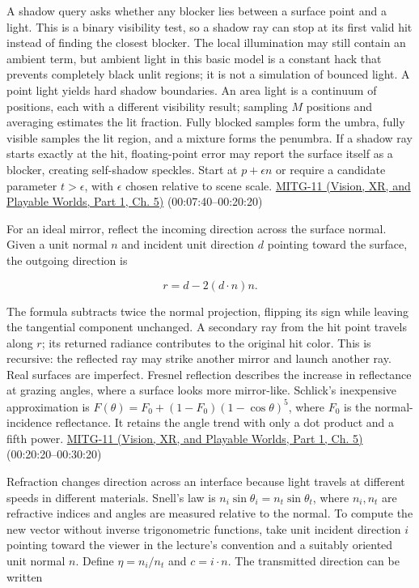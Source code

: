A shadow query asks whether any blocker lies between a surface point and a light. This is a binary visibility test, so a shadow ray can stop at its first valid hit instead of finding the closest blocker. The local illumination may still contain an ambient term, but ambient light in this basic model is a constant hack that prevents completely black unlit regions; it is not a simulation of bounced light. A point light yields hard shadow boundaries. An area light is a continuum of positions, each with a different visibility result; sampling \(M\) positions and averaging estimates the lit fraction. Fully blocked samples form the umbra, fully visible samples the lit region, and a mixture forms the penumbra. If a shadow ray starts exactly at the hit, floating-point error may report the surface itself as a blocker, creating self-shadow speckles. Start at \(p+\epsilon n\) or require a candidate parameter \(t>\epsilon\), with \(\epsilon\) chosen relative to scene scale. \href{../07-Vision-XR-and-Playable-Worlds-P01/main.pdf\#04-visual-computing-ii-ch036-mitg-11---ray-tracing}{MITG-11 (Vision, XR, and Playable Worlds, Part 1, Ch. 5)} (00:07:40--00:20:20)

For an ideal mirror, reflect the incoming direction across the surface normal. Given a unit normal \(n\) and incident unit direction \(d\) pointing toward the surface, the outgoing direction is

\[
r=d-2(d\cdot n)n.
\]

The formula subtracts twice the normal projection, flipping its sign while leaving the tangential component unchanged. A secondary ray from the hit point travels along \(r\); its returned radiance contributes to the original hit color. This is recursive: the reflected ray may strike another mirror and launch another ray. Real surfaces are imperfect. Fresnel reflection describes the increase in reflectance at grazing angles, where a surface looks more mirror-like. Schlick's inexpensive approximation is \(F(\theta)=F_0+(1-F_0)(1-\cos\theta)^5\), where \(F_0\) is the normal-incidence reflectance. It retains the angle trend with only a dot product and a fifth power. \href{../07-Vision-XR-and-Playable-Worlds-P01/main.pdf\#04-visual-computing-ii-ch036-mitg-11---ray-tracing}{MITG-11 (Vision, XR, and Playable Worlds, Part 1, Ch. 5)} (00:20:20--00:30:20)

Refraction changes direction across an interface because light travels at different speeds in different materials. Snell's law is \(n_i\sin\theta_i=n_t\sin\theta_t\), where \(n_i,n_t\) are refractive indices and angles are measured relative to the normal. To compute the new vector without inverse trigonometric functions, take unit incident direction \(i\) pointing toward the viewer in the lecture's convention and a suitably oriented unit normal \(n\). Define \(\eta=n_i/n_t\) and \(c=i\cdot n\). The transmitted direction can be written


